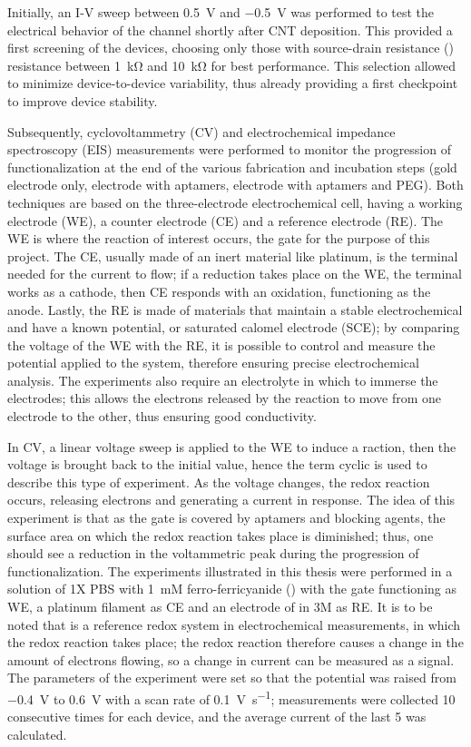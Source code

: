 Initially, an I-V sweep between \SI{0.5}{\V} and \SI{-0.5}{\V} was performed to test the electrical behavior of the channel shortly after CNT deposition. This provided a first screening of the devices, choosing only those with source-drain resistance (\rds{}) resistance between \SI{1}{\kohm} and \SI{10}{\kohm} for best performance. This selection allowed to minimize device-to-device variability, thus already providing a first checkpoint to improve device stability.

Subsequently, cyclovoltammetry (CV) and electrochemical impedance spectroscopy (EIS) measurements were performed to monitor the progression of functionalization at the end of the various fabrication and incubation steps (gold electrode only, electrode with aptamers, electrode with aptamers and PEG). Both techniques are based on the three-electrode electrochemical cell, having a working electrode (WE), a counter electrode (CE) and a reference electrode (RE). The WE is where the reaction of interest occurs, \ie{} the gate for the purpose of this project. The CE, usually made of an inert material like platinum, is the terminal needed for the current to flow; if a reduction takes place on the WE, the terminal works as a cathode, then CE responds with an oxidation, functioning as the anode. Lastly, the RE is made of materials that maintain a stable electrochemical and have a known potential, \eg{}  or saturated calomel electrode (SCE); by comparing the voltage of the WE with the RE, it is possible to control and measure the potential applied to the system, therefore ensuring precise electrochemical analysis. The experiments also require an electrolyte in which to immerse the electrodes; this allows the electrons released by the reaction to move from one electrode to the other, thus ensuring good conductivity.

In CV, a linear voltage sweep is applied to the WE to induce a raction, then the voltage is brought back to the initial value, hence the term cyclic is used to describe this type of experiment. As the voltage changes, the redox reaction occurs, releasing electrons and generating a current in response. 
The idea of this experiment is that as the gate is covered by aptamers and blocking agents, the surface area on which the redox reaction takes place is diminished; thus, one should see a reduction in the voltammetric peak during the progression of functionalization.
The experiments illustrated in this thesis were performed in a solution of 1X PBS with \SI{1}{mM} ferro-ferricyanide () with the gate functioning as WE, a platinum filament as CE and an electrode of  in 3M  as RE. It is to be noted that  is a reference redox system in electrochemical measurements, in which the redox reaction  takes place; the redox reaction therefore causes a change in the amount of electrons flowing, so a change in current can be measured as a signal.
The parameters of the experiment were set so that the potential was raised from \SI{-0.4}{V} to \SI{+0.6}{V} with a scan rate of \SI{0.1}{\V\per\s}; measurements were collected 10 consecutive times for each device, and the average current of the last 5 was calculated.

